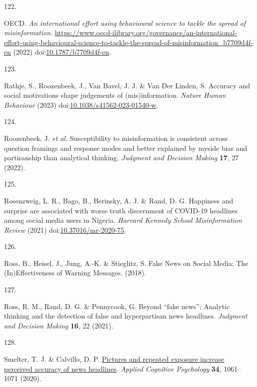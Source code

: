 \documentclass[
  man]{apa6}
\newlength{\cslhangindent}
\newlength{\csllabelwidth}
\newenvironment{CSLReferences}[2] %
 {\begin{list}{}{%
  \setlength{\itemindent}{0pt}
  \setlength{\leftmargin}{0pt}
  \setlength{\parsep}{0pt}
  \ifodd #1
   \setlength{\leftmargin}{\cslhangindent}
   \setlength{\itemindent}{-1\cslhangindent}
  \fi
  \setlength{\itemsep}{#2\baselineskip}}}
 {\end{list}}
\newcommand{\CSLLeftMargin}[1]{\parbox[t]{\csllabelwidth}{\strut#1\strut}}
\newcommand{\CSLRightInline}[1]{\parbox[t]{\linewidth - \csllabelwidth}{\strut#1\strut}}
\begin{document}
\begin{CSLReferences}{0}{0}
\CSLLeftMargin{122. }%
\CSLRightInline{*OECD. \emph{An international effort using behavioural science to tackle the spread of misinformation}. \url{https://www.oecd-ilibrary.org/governance/an-international-effort-using-behavioural-science-to-tackle-the-spread-of-misinformation_b7709d4f-en} (2022) doi:\href{https://doi.org/10.1787/b7709d4f-en}{10.1787/b7709d4f-en}.}

\CSLLeftMargin{123. }%
\CSLRightInline{*Rathje, S., Roozenbeek, J., Van Bavel, J. J. \& Van Der Linden, S. Accuracy and social motivations shape judgements of (mis)information. \emph{Nature Human Behaviour} (2023) doi:\href{https://doi.org/10.1038/s41562-023-01540-w}{10.1038/s41562-023-01540-w}.}

\CSLLeftMargin{124. }%
\CSLRightInline{*Roozenbeek, J. \emph{et al.} Susceptibility to misinformation is consistent across question framings and response modes and better explained by myside bias and partisanship than analytical thinking. \emph{Judgment and Decision Making} \textbf{17}, 27 (2022).}

\CSLLeftMargin{125. }%
\CSLRightInline{*Rosenzweig, L. R., Bago, B., Berinsky, A. J. \& Rand, D. G. Happiness and surprise are associated with worse truth discernment of COVID-19 headlines among social media users in Nigeria. \emph{Harvard Kennedy School Misinformation Review} (2021) doi:\href{https://doi.org/10.37016/mr-2020-75}{10.37016/mr-2020-75}.}

\CSLLeftMargin{126. }%
\CSLRightInline{*Ross, B., Heisel, J., Jung, A.-K. \& Stieglitz, S. Fake News on Social Media: The (In)Effectiveness of Warning Messages. (2018).}

\CSLLeftMargin{127. }%
\CSLRightInline{*Ross, R. M., Rand, D. G. \& Pennycook, G. Beyond {``}fake news{''}: Analytic thinking and the detection of false and hyperpartisan news headlines. \emph{Judgment and Decision Making} \textbf{16}, 22 (2021).}

\CSLLeftMargin{128. }%
\CSLRightInline{*Smelter, T. J. \& Calvillo, D. P. \href{https://doi.org/10.1002/acp.3684}{Pictures and repeated exposure increase perceived accuracy of news headlines}. \emph{Applied Cognitive Psychology} \textbf{34}, 1061--1071 (2020).}


\end{CSLReferences}
\end{document}
